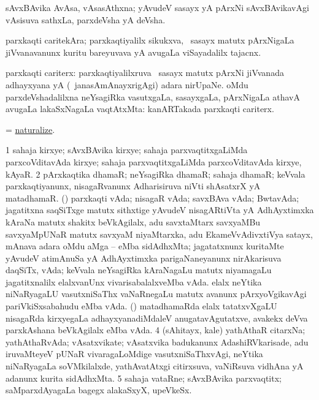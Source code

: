 \bentry
{}
\gl{\nA}
\bmng
sAvxBAvika AvAsa, vAsasAthxna; yAvudeV sasayx yA pArxNi sAvxBAvikavAgi vAsisuva sathxLa, parxdeVsha yA deVsha. 
\emng
\eentry

\bentry
{}
\gl{\nA}
\bmng
parxkaqti caritekAra; parxkaqtiyalilx sikukxva, \kanmu\ sasayx matutx pArxNigaLa jiVvanavanunx kuritu bareyuvava yA avugaLa viSayadalilx tajacnx. 
\emng
\eentry

\bentry
{}
\gl{\nA}
\bmng
parxkaqti cariterx: 
\banum
{} parxkaqtiyalilxruva \kanmu\ sasayx matutx pArxNi jiVvanada adhayxyana yA (\kanmu\ janasAmAnayxrigAgi) adara nirUpaNe. 
 oMdu parxdeVshadalilxna neYsagiRka vasutxgaLa, sasayxgaLa, pArxNigaLa athavA avugaLa lakaSxNagaLa vaqtAtxMta:  kanARTakada parxkaqti cariterx. 
\eanum
\emng
\eentry

\bentry
{}
\gl{\kirx}
\bmng
= \hyperlink{naturalize}{naturalize}.
\emng
\eentry

\bentry
{}
\gl{\nA}
\bmng
\bnum
\num{1} sahaja kirxye; sAvxBAvika kirxye; sahaja parxvaqtitxgaLiMda parxcoVditavAda kirxye; sahaja parxvaqtitxgaLiMda parxcoVditavAda kirxye, kAyaR. 
\hypertarget{naturalism(2)}{} 
\num{2} pArxkaqtika dhamaR; neYsagiRka dhamaR; sahaja dhamaR; keVvala parxkaqtiyanunx, nisagaRvanunx Adharisiruva niVti shAsatxrX yA matadhamaR. 
 (\tashA) parxkaqti vAda; nisagaR vAda; savxBAva vAda; BwtavAda; 
\banum
{} jagatitxna saqSiTxge matutx sithxtige yAvudeV nisagARtiVta yA AdhAyxtimxka kAraNa matutx shakitx beVkAgilalx, adu savxtaMtarx savxyaMBu savxyaMpUNaR matutx savxyaM niyaMtarxka, adu EkameVvAdivxtiVya satayx, mAnava adara oMdu aMga -- eMba sidAdhxMta; jagatatxnunx kuritaMte yAvudeV atimAnuSa yA AdhAyxtimxka parigaNaneyanunx nirAkarisuva daqSiTx, vAda; keVvala neYsagiRka kAraNagaLu matutx niyamagaLu jagatitxnalilx elalxvanUnx vivarisabalalxveMba vAda. 
 elalx neYtika niNaRyagaLU vasutxniSaThx vaNaRnegaLu matutx avanunx pArxyoVgikavAgi pariVkiSxsabahudu eMba vAda. 
 (\deVva) matadhamaRda elalx tatatxvXgaLU nisagaRda kirxyegaLa adhayxyanadiMdaleV anugatavAgutatxve, avakekx deVva parxkAshana beVkAgilalx eMba vAda. 
\eanum
\numie
\num{4} (sAhitayx, kale) yathAthaR citarxNa; yathAthaRvAda; vAsatxvikate; vAsatxvika badukanunx AdashiRVkarisade, adu iruvaMteyeV pUNaR vivaragaLoMdige vasutxniSaThxvAgi, neYtika niNaRyagaLa soVMkilalxde, yathAvatAtxgi citirxsuva, vaNiRsuva vidhAna yA adanunx kurita sidAdhxMta. 
\num{5} sahaja vataRne; sAvxBAvika parxvaqtitx; saMparxdAyagaLa bagegx alakaSxyX, upeVkeSx. 
\enum
\emng
\eentry

